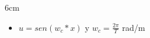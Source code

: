 \begin{frame}
{\begin{columns}[t]
\begin{column}{6cm}
\begin{itemize}
\item $u=sen(w_c*x)$ y $w_c= \frac{2\pi}{T}$ rad/m
\end{itemize}

\end{column}



\end{columns}

}

\end{frame}


